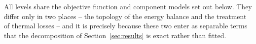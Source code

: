 
All levels share the objective function and component models set out below. They differ
only in two places -- the topology of the energy balance and the treatment of thermal
losses -- and it is precisely because these two enter as separable terms that the
decomposition of Section~\ref{sec:results} is exact rather than fitted.

